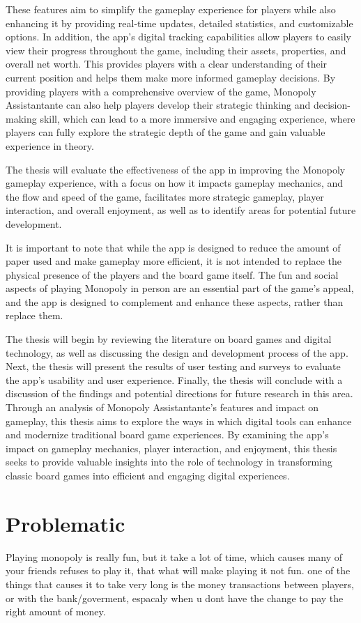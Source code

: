 \documentclass{article}
\begin{document}
These features aim to simplify the gameplay experience for players while also enhancing it by providing real-time updates, detailed statistics, and customizable options. 
In addition, the app's digital tracking capabilities allow players to easily view their progress throughout the game, including their assets, properties, and overall net worth. This provides players with a clear understanding of their current position and helps them make more informed gameplay decisions. By providing players with a comprehensive overview of the game, Monopoly Assistantante can also help players develop their strategic thinking and decision-making skill, which can lead to a more immersive and engaging experience, where players can fully explore the strategic depth of the game and gain valuable experience in theory.  

The thesis will evaluate the effectiveness of the app in improving the Monopoly gameplay experience, with a focus on how it impacts gameplay mechanics, and the flow and speed of the game, facilitates more strategic gameplay, player interaction, and overall enjoyment, as well as to identify areas for potential future development.

It is important to note that while the app is designed to reduce the amount of paper used and make gameplay more efficient, it is not intended to replace the physical presence of the players and the board game itself. The fun and social aspects of playing Monopoly in person are an essential part of the game's appeal, and the app is designed to complement and enhance these aspects, rather than replace them.

The thesis will begin by reviewing the literature on board games and digital technology, as well as discussing the design and development process of the app. Next, the thesis will present the results of user testing and surveys to evaluate the app's usability and user experience. Finally, the thesis will conclude with a discussion of the findings and potential directions for future research in this area.
Through an analysis of Monopoly Assistantante's features and impact on gameplay, this thesis aims to explore the ways in which digital tools can enhance and modernize traditional board game experiences. By examining the app's impact on gameplay mechanics, player interaction, and enjoyment, this thesis seeks to provide valuable insights into the role of technology in transforming classic board games into efficient and engaging digital experiences.

\section{Problematic}\label{sec:prbm}
Playing monopoly is really fun, but it take a lot of time, which causes many of your friends refuses to play it, that what will make playing it not fun.
one of the things that causes it to take very long is the money transactions between players, or with the bank/goverment, espacaly when u dont have the change to pay the right amount of money.
\end{document}
